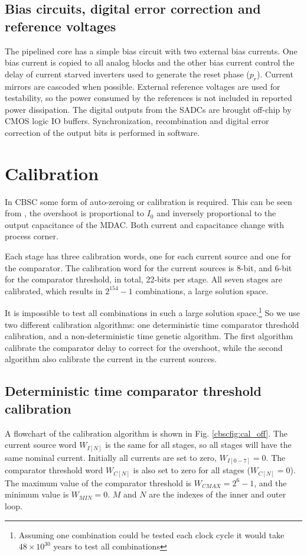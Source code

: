 \subsection{Bias circuits, digital error correction and reference voltages}
The pipelined core has a simple bias circuit with two external bias
currents. One bias current is copied to all analog blocks 
and the other bias current control the delay of current starved inverters used to
generate the reset phase ($p_r$). Current mirrors are cascoded when possible. External reference voltages are used for
testability, so the power
consumed by the references is not included in reported
power dissipation. The digital outputs from the SADCs are brought
off-chip by CMOS logic IO buffers. Synchronization,
recombination and digital error correction of the output bits is performed in software.

\section{Calibration}\label{cbsccalibration}
In CBSC some form of auto-zeroing or calibration is required. This can
be seen from , the overshoot is proportional to
$I_0$ and inversely proportional to the output capacitance of the
MDAC. Both current and capacitance change with process corner. 

Each stage has three calibration words, one for each
current source and one for the comparator. The calibration
word for the current sources is 8-bit, and 6-bit for the comparator threshold,
in total, 22-bits per stage. All seven stages are calibrated, which
results in $2^{154}-1$ combinations, a  large
solution space.

 It is impossible to test all combinations in such a large solution
space.\footnote{Assuming one combination could be tested each clock
  cycle it would take $48\times 10^{30}$ years to test all
  combinations} So we 
use two different calibration  
algorithms: one deterministic time comparator threshold calibration, and a
non-deterministic time genetic algorithm. The
first algorithm calibrate the  comparator delay to correct for the overshoot, while the
second algorithm also calibrate the current in the current sources.

\subsection{Deterministic time comparator threshold calibration }
A flowchart of the calibration algorithm is shown in Fig.
\ref{cbscfig:cal_off}.  The current source word $W_{I[N]}$ is
the same for all stages, so all stages will have the
same nominal current. Initially all currents are set to zero,
$W_{I[0-7]} = 0 $. The comparator threshold word $W_{C[N]}$ is also set to
zero for all stages ($W_{C[N]} = 0$). The maximum value of the comparator
threshold is $W_{CMAX} = 2^6-1$, and the minimum value is $W_{MIN} =
0$. $M$ and $N$ are the indexes of the inner and outer loop.

